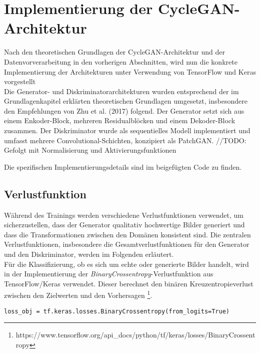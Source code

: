 \section{Implementierung der CycleGAN-Architektur}
Nach den theoretischen Grundlagen der CycleGAN-Architektur und der Datenvorverarbeitung in den vorherigen Abschnitten, wird nun die konkrete Implementierung der Architekturen unter Verwendung von TensorFlow und Keras vorgestellt 
\\
Die Generator- und Diskriminatorarchitekturen wurden entsprechend der im Grundlagenkapitel erklärten theoretischen Grundlagen umgesetzt, insbesondere den Empfehlungen von Zhu et al. (2017)\cite{Zhu.2017} folgend. Der Generator setzt sich aus einem Enkoder-Block, mehreren Residualblöcken und einem Dekoder-Block zusammen. Der Diskriminator wurde als sequentielles Modell implementiert und umfasst mehrere Convolutional-Schichten, konzipiert als PatchGAN. //TODO: Gefolgt mit Normalisierung und Aktivierungsfunktionen

Die spezifischen Implementierungsdetails sind im beigefügten Code zu finden.

\subsection{Verlustfunktion}
Während des Trainings werden verschiedene Verlustfunktionen verwendet, um sicherzustellen, dass der Generator qualitativ hochwertige Bilder generiert und dass die Transformationen zwischen den Domänen konsistent sind. Die zentralen Verlustfunktionen, insbesondere die Gesamtverlustfunktionen für den Generator und den Diskriminator, werden im Folgenden erläutert. 
\\
Für die Klassifizierung, ob es sich um echte oder generierte Bilder handelt, wird in der Implementierung der \textit{BinaryCrossentropy}-Verlustfunktion aus TensorFlow/Keras verwendet. Dieser  berechnet den binären Kreuzentropieverlust zwischen den Zielwerten und den Vorhersagen \footnote{https://www.tensorflow.org/api_docs/python/tf/keras/losses/BinaryCrossentropy}.

\begin{lstlisting}[language=pyhaff, caption={Initialisierung des BinaryCrossentropy-Verlustfunktion}, label={cod:binaryCrossentropy}]
loss_obj = tf.keras.losses.BinaryCrossentropy(from_logits=True)
\end{lstlisting}


